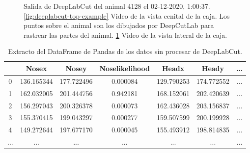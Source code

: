 \begin{figure}[H]
\begin{subfigure}{0.45\textwidth}
    \caption{}
    \label{fig:deeplabcut-lateral-example}
  \end{subfigure}
  \caption[Salida de DeepLabCut.]
  {Salida de DeepLabCut del animal 4128 el 02-12-2020, 1:00:37. \ref{fig:deeplabcut-top-example} Video de la vista cenital de la caja. Los puntos sobre el animal son los dibujados por DeepCutLab para rastrear las partes del animal. \ref{fig:deeplabcut-lateral-example} Video de la vista lateral de la caja.}
  \label{fig:deeplabcut-outputexamples}
\end{figure}

\begin{table}[h]
  \centering
  \begin{tabular}{|c|c|c|c|c|c|c|}
  \hline
    & Nosex & Nosey & Noselikelihood & Headx & Heady & ... \\
  \hline
  0 & 136.165344 & 177.722496 & 0.000084 & 129.790253 & 174.772552 & ... \\
  1 & 162.032005 & 201.444756 & 0.942181 & 168.152061 & 202.420639 & ... \\
  2 & 156.297043 & 200.326378 & 0.000073 & 162.436028 & 203.156837 & ... \\
  3 & 155.370415 & 199.043297 & 0.000277 & 159.507599 & 200.199928 & ... \\
  4 & 149.272644 & 197.677170 & 0.000045 & 155.493912 & 198.814835 & ... \\
  ... & ... & ... & ... & ... & ... & ... \\
  \hline
  \end{tabular}
  \caption{Extracto del DataFrame de Pandas de los datos sin procesar de DeepLabCut.}
  \label{tab:df-example}
\end{table}

